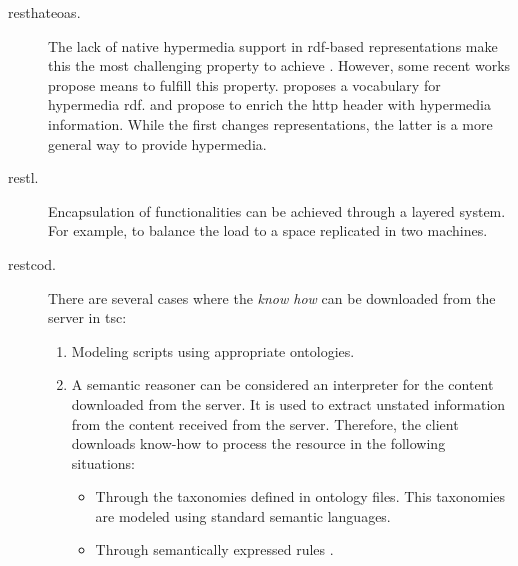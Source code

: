 \begin{description}
	\item[\ac{resthateoas}.] The lack of native hypermedia support in \ac{rdf}-based representations make this the most challenging property to achieve \citep{page_rest_2011}. %
				  However, some recent works propose means to fulfill this property.
				  \citet{kjernsmo_necessity_2012} proposes a vocabulary for hypermedia \ac{rdf}.
				  \citet{steiner_fulfilling_2011} and \citet{verborgh_functional_2012} propose to enrich the \ac{http} header with hypermedia information.
				  While the first changes representations, the latter is a more general way to provide hypermedia.
 \item[\ac{restl}.] Encapsulation of functionalities can be achieved through a layered system.
                     For example, to balance the load to a space replicated in two machines.
 \item[\ac{restcod}.] There are several cases where the \emph{know how} can be downloaded from the server in \ac{tsc}: %
            \begin{enumerate}
	      \item Modeling scripts using appropriate ontologies. %
	      \item A semantic reasoner can be considered an interpreter for the content downloaded from the server.
	            It is used to extract unstated information from the content received from the server.
	            Therefore, the client downloads know-how to process the resource in the following situations:
		    \begin{itemize}
		      \item Through the taxonomies defined in ontology files. %
		            This taxonomies are modeled using standard semantic languages. %
		      \item Through semantically expressed rules \citep{berners-lee_n3logic:_2008}. %
		    \end{itemize}
            \end{enumerate}
\end{description}


